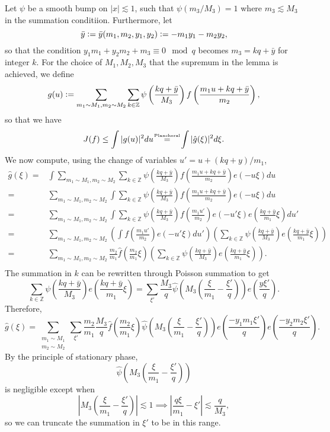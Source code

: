 Let $\psi$ be a smooth bump on $|x|\lesssim 1$, such that $\psi(m_3/M_3)=1$ where $m_3\lesssim M_3$ in the summation conditiion. Furthermore, let \[
    \bar{y}\mathrel{\mathop:}= \bar{y}(m_1,m_2,y_1,y_2)\mathrel{\mathop:}= -m_1y_1-m_2y_2,
\]so that the condition $y_1m_1+y_2m_2+m_3\equiv 0 \mod q$ becomes $m_3=kq+\bar{y}$ for integer $k$.
For the choice of $M_1,M_2,M_3$ that the supremum in the lemma is achieved, we define \[
    g(u)\mathrel{\mathop:}=\sum_{m_1\sim M_1,m_2\sim M_2} \sum_{k\in \mathbb{Z}} \psi\left(\frac{kq+\bar{y}}{M_3}\right)f\left(\frac{m_1 u+kq+\bar{y}}{m_2}\right),
\]so that we have \[
J(f)\leq \int |g(u)|^2 du \quad \stackeq{Plancheral} \quad  \int |\hat{g}(\xi)|^2 d\xi.
\]
We now compute, using the change of variables $u'=u+(kq+y)/m_1$, \begin{align*}
    \hat{g}(\xi)=&\int \sum_{m_1\sim M_1,m_2\sim M_2} \sum_{k\in \mathbb{Z}} \psi\left(\frac{kq+\bar{y}}{M_3}\right)f\left(\frac{m_1 u+kq+\bar{y}}{m_2}\right) e(-u\xi) du\\
    =& \sum_{m_1\sim M_1,m_2\sim M_2}\int \sum_{k\in \mathbb{Z}} \psi\left(\frac{kq+\bar{y}}{M_3}\right)f\left(\frac{m_1 u+kq+\bar{y}}{m_2}\right) e(-u\xi) du\\
    =& \sum_{m_1\sim M_1,m_2\sim M_2}\int \sum_{k\in \mathbb{Z}} \psi\left(\frac{kq+\bar{y}}{M_3}\right)f\left(\frac{m_1 u'}{m_2}\right) e(-u'\xi) e\left(\frac{kq+\bar{y}}{m_1}\xi\right)du'\\
    =& \sum_{m_1\sim M_1,m_2\sim M_2} \left(\int f\left(\frac{m_1 u'}{m_2}\right) e(-u'\xi) du'\right)\left(\sum_{k\in \mathbb{Z}} \psi\left(\frac{kq+\bar{y}}{M_3}\right) e\left(\frac{kq+\bar{y}}{m_1}\xi\right)\right)\\
    =& \sum_{m_1\sim M_1,m_2\sim M_2} \frac{m_2}{m_1}\hat{f}\left(\frac{m_2}{m_1}\xi\right)\left(\sum_{k\in \mathbb{Z}} \psi\left(\frac{kq+\bar{y}}{M_3}\right) e\left(\frac{kq+\bar{y}}{m_1}\xi\right)\right).\\
\end{align*}
The summation in $k$ can be rewritten through Poisson summation to get \[
    \sum_{k\in \mathbb{Z}} \psi\left(\frac{kq+\bar{y}}{M_3}\right) e\left(\frac{kq+\bar{y}}{m_1}\xi\right) = \sum_{\xi'} \frac{M_3}{q}\hat{\psi}\left(M_3\left(\frac{\xi}{m_1}-\frac{\xi'}{q}\right)\right)e\left(\frac{y\xi'}{q}\right).
\]
Therefore,
\[
\hat{g}(\xi) = \sum_{\substack{m_1\sim M_1\\m_2\sim M_2}}\sum_{\xi'}\frac{m_2}{m_1}\frac{M_3}{q}\hat{f}\left(\frac{m_2}{m_1}\xi\right)\hat\psi\left(M_3\left(\frac{\xi}{m_1}-\frac{\xi'}{q}\right)\right)e\left(\frac{-y_1m_1\xi'}{q}\right)e\left(\frac{-y_2m_2\xi'}{q}\right).
\]
By the principle of stationary phase, \[
\hat\psi\left(M_3\left(\frac{\xi}{m_1}-\frac{\xi'}{q}\right)\right)\]
is negligible except when  \[
\left|M_3\left(\frac{\xi}{m_1}-\frac{\xi'}{q}\right)\right| \lesssim 1 \implies \left|\frac{q\xi}{m_1}-\xi'\right|\lesssim \frac{q}{M_3},\]
so we can truncate the summation in $\xi'$ to be in this range.

